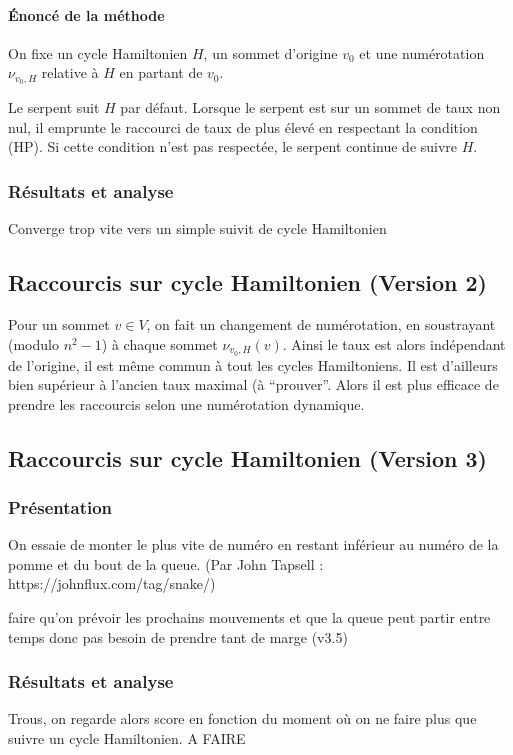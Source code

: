 \documentclass[french,a4paper]{article}
\begin{document}
\paragraph{Énoncé de la méthode}
On fixe un cycle Hamiltonien $H$, un sommet d'origine $v_0$ et une numérotation $\nu_{v_0,H}$ relative à $H$ en partant de $v_0$.

Le serpent suit $H$ par défaut. Lorsque le serpent est sur un sommet de taux non nul, il emprunte le raccourci de taux de plus élevé en respectant la condition (HP). Si cette condition n'est pas respectée, le serpent continue de suivre $H$.


\subsubsection{Résultats et analyse}
Converge trop vite vers un simple suivit de cycle Hamiltonien



\subsection{Raccourcis sur cycle Hamiltonien (Version 2)}

Pour un sommet $v \in V$, on fait un changement de numérotation, en soustrayant (modulo $n^2-1$) à chaque sommet $\nu_{v_0,H}(v)$. Ainsi le taux est alors indépendant de l'origine, il est même commun à tout les cycles Hamiltoniens. Il est d'ailleurs bien supérieur à l'ancien taux maximal (à ``prouver''. Alors il est plus efficace de prendre les raccourcis selon une numérotation dynamique.

\subsection{Raccourcis sur cycle Hamiltonien (Version 3)}

\subsubsection{Présentation}
On essaie de monter le plus vite de numéro en restant inférieur au numéro de la pomme et du bout de la queue. (Par John Tapsell : https://johnflux.com/tag/snake/)

faire qu'on prévoir les prochains mouvements et que la queue peut partir entre temps donc pas besoin de prendre tant de marge (v3.5)

\subsubsection{Résultats et analyse}
Trous, on regarde alors score en fonction du moment où on ne faire plus que suivre un cycle Hamiltonien. A FAIRE
\end{document}
